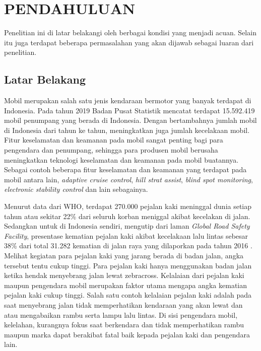 \chapter{PENDAHULUAN}
\label{chap:pendahuluan}


Penelitian ini di latar belakangi oleh berbagai kondisi yang menjadi acuan. Selain itu juga terdapat beberapa permasalahan yang akan dijawab sebagai luaran dari penelitian.

\section{Latar Belakang}
\label{sec:latarbelakang}

Mobil merupakan salah satu jenis kendaraan bermotor yang banyak terdapat di Indonesia. Pada tahun 2019 Badan Pusat Statistik mencatat terdapat 15.592.419 mobil penumpang yang berada di Indonesia. Dengan bertambahnya jumlah mobil di Indonesia dari tahun ke tahun, meningkatkan juga jumlah kecelakaan mobil. Fitur keselamatan dan keamanan pada mobil sangat penting bagi para pengendara dan penumpang, sehingga para produsen mobil berusaha meningkatkan teknologi keselamatan dan keamanan pada mobil buatannya. Sebagai contoh beberapa fitur keselamatan dan keamanan yang terdapat pada mobil antara lain, \textit{adaptive cruise control}, \textit{hill strat assist}, \textit{blind spot monitoring}, \textit{electronic stability control} dan lain sebagainya.

Menurut data dari WHO, terdapat 270.000 pejalan kaki meninggal dunia setiap tahun atau sekitar 22\% dari seluruh korban meniggal akibat kecelakan di jalan\cite{who}. Sedangkan untuk di Indonesia sendiri, mengutip dari laman \textit{Global Road Safety Facility}, presentase kematian pejalan kaki akibat kecelakaan lalu lintas sebesar 38\% dari total 31.282 kematian di jalan raya yang dilaporkan pada tahun 2016 \cite{grsf}. Melihat kegiatan para pejalan kaki yang jarang berada di badan jalan, angka tersebut tentu cukup tinggi. Para pejalan kaki hanya menggunakan badan jalan ketika hendak menyebrang jalan lewat zebracross. Kelalaian dari pejalan kaki maupun pengendara mobil merupakan faktor utama mengapa angka kematian pejalan kaki cukup tinggi. Salah satu contoh kelalaian pejalan kaki adalah pada saat menyebrang jalan tidak memperhatikan kendaraan yang akan lewat dan atau mengabaikan rambu serta lampu lalu lintas. Di sisi pengendara mobil, kelelahan, kurangnya fokus saat berkendara dan tidak memperhatikan rambu maupun marka dapat berakibat fatal baik kepada pejalan kaki dan pengendara lain.

